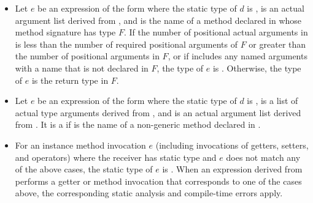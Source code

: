 \documentclass[makeidx]{article}
\begin{document}
\begin{itemize}
\item
  Let $e$ be an expression of the form 
  where the static type of $d$ is \DYNAMIC,  is
  an actual argument list derived from ,
  and \id{} is the name of a method declared in 
  whose method signature has type $F$.
  If the number of positional actual arguments in 
  is less than the number of required positional arguments of $F$
  or greater than the number of positional arguments in $F$,
  or if  includes any named arguments
  with a name that is not declared in $F$,
  the type of $e$ is \DYNAMIC.
  Otherwise, the type of $e$ is the return type in $F$.

\item
  Let $e$ be an expression of the form
   where
  the static type of $d$ is \DYNAMIC,
   is a list of actual
  type arguments derived from , and
   is an actual argument list derived from .
  It is a  if \id{} is the name of
  a non-generic method declared in .

\item
  For an instance method invocation $e$ (including invocations of getters,
  setters, and operators) where the receiver has static type \DYNAMIC{} and
  $e$ does not match any of the above cases, the static type of $e$ is
  \DYNAMIC.
  When an expression derived from  performs
  a getter or method invocation that corresponds to one of the cases above,
  the corresponding static analysis and compile-time errors apply.
\end{itemize}
\end{document}
